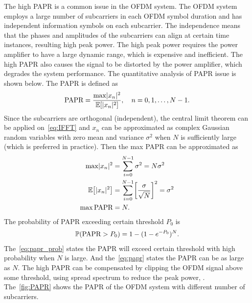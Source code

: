 The high PAPR is a common issue in the OFDM system. The OFDM system employs a large number of subcarriers in each OFDM symbol duration and has independent information symbols on each subcarrier. The independence means that the phases and amplitudes of the subcarriers can align at certain time instances, resulting high peak power. The high peak power requires the power amplifier to have a large dynamic range, which is expensive and inefficient. The high PAPR also causes the signal to be distorted by the power amplifier, which degrades the system performance. The quantitative analysis of PAPR issue is shown below. The PAPR is defined as
\begin{equation}
    \text{PAPR} = \frac{\max\abs{x_n}^2}{\E{\abs{x_n}^2}}, \quad n=0,1,\ldots,N-1.
\end{equation}
Since the subcarriers are orthogonal (independent), the central limit theorem can be applied on~\cref{eq:IFFT} and $x_n$ can be approximated as complex Gaussian random variables with zero mean and variance $\sigma^2$ when $N$ is sufficiently large (which is preferred in practice). Then the max PAPR can be approximated as
\begin{align}
    \max\abs{x_n}^2
    &= \sum_{i=0}^{N-1} \sigma^2 = N\sigma^2 \\
    \E{\abs{x_n}^2}
    &= \sum_{i=0}^{N-1} \bracks*{\frac{\sigma}{\sqrt{N}}}^2 = \sigma^2 \\
    \max\text{PAPR}
    &= N. \label{eq:papr}
\end{align}
The probability of PAPR exceeding certain threshold $P_0$ is
\begin{equation}
    \label{eq:papr_prob}
    \P{\text{PAPR}>P_0} = 1 - (1-e^{-P_0})^N.
\end{equation}
The~\cref{eq:papr_prob} states the PAPR will exceed certain threshold with high probability when $N$ is large. And the~\cref{eq:papr} states the PAPR can be as large as $N$. The high PAPR can be compensated by clipping the OFDM signal above some threshold, using spread spectrum to reduce the peak power, \etc. The~\cref{fig:PAPR} shows the PAPR of the OFDM system with different number of subcarriers.

